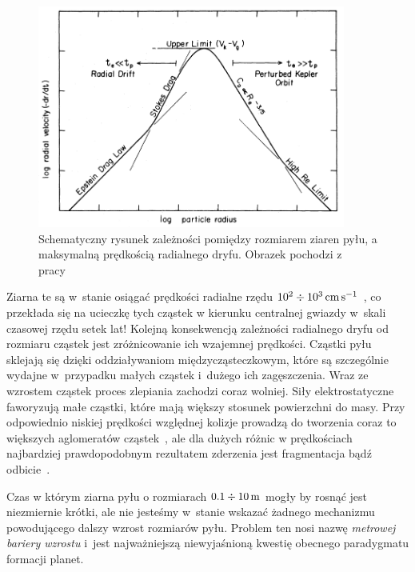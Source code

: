 \begin{figure}
   \includegraphics[width=0.9\textwidth]{figures/chap1_drift.png}
   \caption{Schematyczny rysunek zależności pomiędzy rozmiarem ziaren pyłu, a
   maksymalną prędkością radialnego dryfu. Obrazek pochodzi z
   pracy~\cite{W77}}
   \label{fig:chap1_drift}
\end{figure}

Ziarna te są w~stanie osiągać prędkości radialne rzędu
$10^2\div10^3\hbox{$\thinspace\textrm{cm}$}\hbox{$\thinspace\textrm{s}$}^{-1}$~\cite{W77}, co przekłada się na ucieczkę tych cząstek w
kierunku centralnej gwiazdy w~skali czasowej rzędu setek lat!  Kolejną
konsekwencją zależności radialnego dryfu od rozmiaru cząstek jest zróżnicowanie
ich wzajemnej prędkości. Cząstki pyłu sklejają się dzięki oddziaływaniom
międzycząsteczkowym, które są szczególnie wydajne w~przypadku małych cząstek
i~dużego ich zagęszczenia. Wraz ze wzrostem cząstek proces zlepiania zachodzi
coraz wolniej.  Siły elektrostatyczne faworyzują małe cząstki, które mają większy stosunek
powierzchni do masy. Przy odpowiednio niskiej prędkości względnej kolizje
prowadzą do tworzenia coraz to większych aglomeratów cząstek~\citep{BW08}, ale
dla dużych różnic w prędkościach najbardziej prawdopodobnym rezultatem zderzenia
jest fragmentacja bądź odbicie~\citep{Z10}. 

\par Czas w którym ziarna pyłu o rozmiarach $0.1 \div 10\hbox{$\thinspace\textrm{m}$}$ mogły
by rosnąć jest niezmiernie krótki, ale nie jesteśmy w~stanie wskazać żadnego
mechanizmu powodującego dalszy wzrost rozmiarów pyłu. Problem ten nosi nazwę
\emph{metrowej bariery wzrostu} i~jest najważniejszą niewyjaśnioną kwestię
obecnego paradygmatu formacji planet. 

